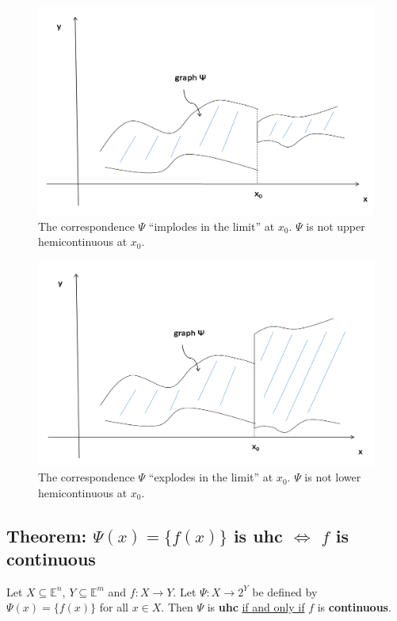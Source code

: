 \documentclass[11pt]{elegantbook}
\begin{document}
\begin{center}\begin{figure}[htbp]
    \centering
    \includegraphics[scale=0.2]{uhc.png}
    \caption{The correspondence $\Psi$ “implodes in the limit” at $x_0$. $\Psi$ is not upper hemicontinuous at $x_0$.}
    \label{}
\end{figure}\end{center}

\begin{center}\begin{figure}[htbp]
    \centering
    \includegraphics[scale=0.2]{lhc.png}
    \caption{The correspondence $\Psi$ “explodes in the limit” at $x_0$. $\Psi$ is not lower hemicontinuous at $x_0$.}
    \label{}
\end{figure}\end{center}

\subsection{Theorem: $\Psi(x)=\{f(x)\}$ is uhc $\Leftrightarrow$ $f$ is continuous}
\begin{theorem}[$\Psi(x)=\{f(x)\}$ is uhc $\Leftrightarrow$ $f$ is continuous]
    Let $X \subseteq \mathbb{E}^n$, $Y \subseteq \mathbb{E}^m$ and $f : X \rightarrow Y$. Let $\Psi : X \rightarrow  2^Y$ be defined by $\Psi(x) = \{f(x)\}$ for all $x \in X$. Then $\Psi$ is \textbf{uhc} \underline{if and only if} $f$ is \textbf{continuous}.
\end{theorem}
\end{document}
